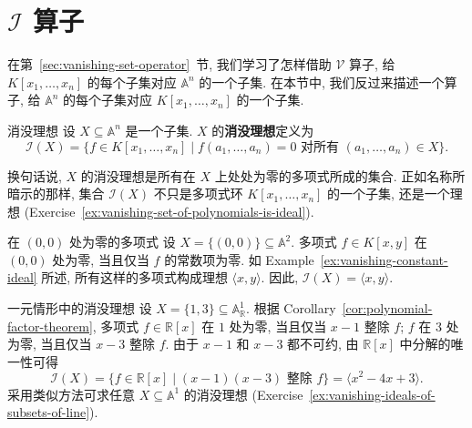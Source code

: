 \section{\texorpdfstring{$\mathcal{I}$}{I} 算子}\label{sec:vanishing-ideal-operator}

在第~\ref{sec:vanishing-set-operator}~节, 我们学习了怎样借助 $\mathcal{V}$ 算子, 给 $K[x_{1},\ldots,x_{n}]$ 的每个子集对应 $\mathbb{A}^{n}$ 的一个子集. 在本节中, 我们反过来描述一个算子, 给 $\mathbb{A}^{n}$ 的每个子集对应 $K[x_{1},\ldots,x_{n}]$ 的一个子集.

\begin{Definition}{消没理想}\leavevmode\label{def:vanishing-ideal}
  设 $X\subseteq\mathbb{A}^{n}$ 是一个子集. $X$ 的\textbf{消没理想}定义为
  \[
    \mathcal{I}(X)=\{f\in K[x_{1},\ldots,x_{n}]
      \mid f(a_{1},\ldots,a_{n})=0\text{ 对所有 }(a_{1},\ldots,a_{n})\in X\}.
  \]
\end{Definition}

换句话说, $X$ 的消没理想是所有在 $X$ 上处处为零的多项式所成的集合. 正如名称所暗示的那样, 集合 $\mathcal{I}(X)$ 不只是多项式环 $K[x_{1},\ldots,x_{n}]$ 的一个子集, 还是一个理想 (Exercise~\ref{ex:vanishing-set-of-polynomials-is-ideal}).

\begin{Example}{在 $(0,0)$ 处为零的多项式}\leavevmode\label{ex:vanishing-ideal-of-origin}
  设 $X=\{(0,0)\}\subseteq\mathbb{A}^{2}$. 多项式 $f\in K[x,y]$ 在 $(0,0)$ 处为零, 当且仅当 $f$ 的常数项为零. 如 Example~\ref{ex:vanishing-constant-ideal} 所述, 所有这样的多项式构成理想 $\langle x,y\rangle$. 因此, $\mathcal{I}(X)=\langle x,y\rangle$.
\end{Example}

\begin{Example}{一元情形中的消没理想}\leavevmode\label{ex:one-variable-vanishing-ideals}
  设 $X=\{1,3\}\subseteq\mathbb{A}^{1}_{\mathbb{R}}$. 根据 Corollary~\ref{cor:polynomial-factor-theorem}, 多项式 $f\in\mathbb{R}[x]$ 在 $1$ 处为零, 当且仅当 $x-1$ 整除 $f$; $f$ 在 $3$ 处为零, 当且仅当 $x-3$ 整除 $f$. 由于 $x-1$ 和 $x-3$ 都不可约, 由 $\mathbb{R}[x]$ 中分解的唯一性可得
  \[
    \mathcal{I}(X)=\{f\in\mathbb{R}[x]\mid(x-1)(x-3)\text{ 整除 }f\}
    =\langle x^{2}-4x+3\rangle.
  \]
  采用类似方法可求任意 $X\subseteq\mathbb{A}^{1}$ 的消没理想 (Exercise~\ref{ex:vanishing-ideals-of-subsets-of-line}).
\end{Example}

